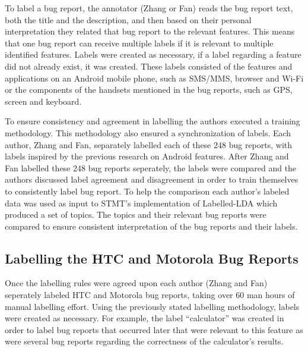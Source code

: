 \documentclass[10pt, conference, compsocconf]{IEEEtran}
\begin{document}
To label a bug report, the annotator (Zhang or Fan) reads the bug
report text, both the title and the description, and  then based on their
personal interpretation they related that bug report to the relevant
features. This means that one bug report can receive multiple labels
if it is relevant to multiple identified features. Labels were created
as necessary, if a label regarding a feature did not already exist, it
was created.
These labels 
consisted of the features and applications on an Android mobile
phone, such as SMS/MMS, browser and Wi-Fi or the components of the
handsets mentioned in the bug reports, such as GPS, screen and
keyboard.


To ensure consistency and agreement in labelling the authors executed a training
methodology. This methodology also ensured a synchronization of labels.
Each author, Zhang and Fan, separately labelled each of these 248 bug reports, 
with labels inspired by the previous research on Android
features. 
After Zhang and Fan labelled these 248 bug reports seperately, the
labels were compared and the authors discussed label agreement and
disagreement in order to train themselves to consistently label bug
report.
To help the comparison each author’s labeled data was used as input to
 STMT's implementation of Labelled-LDA which produced a set of topics.
The topics and their relevant bug reports were compared to ensure
consistent interpretation of the bug reports and their labels.




\subsection{Labelling the HTC and Motorola Bug Reports}

Once the labelling rules were agreed upon each author (Zhang and Fan)
seperately labeled HTC and Motorola bug reports, taking over 60 man
hours of manual labelling effort.
Using the previously stated labelling methodology, labels were created as necessary.
For example, the label ``calculator'' was created in order to label
bug reports that occurred later that were relevant to this feature as
were several bug reports regarding the correctness of the
calculator's results. 
\end{document}
